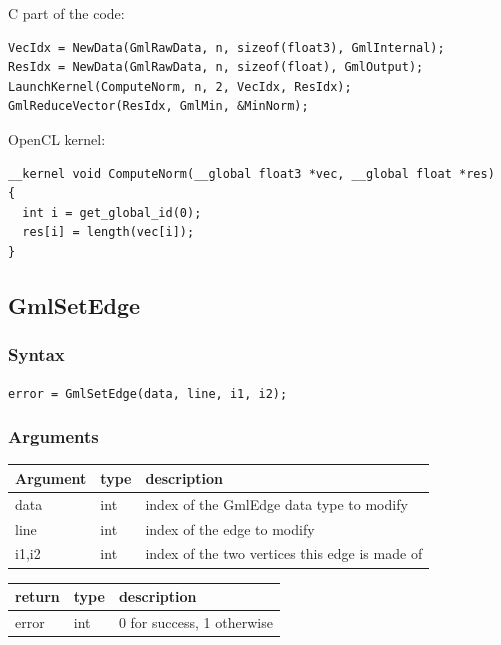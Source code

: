 \documentclass[a4paper,12pt]{article}
\begin{document}
C part of the code:

\begin{tt}
\begin{verbatim}
VecIdx = NewData(GmlRawData, n, sizeof(float3), GmlInternal);
ResIdx = NewData(GmlRawData, n, sizeof(float), GmlOutput);
LaunchKernel(ComputeNorm, n, 2, VecIdx, ResIdx);
GmlReduceVector(ResIdx, GmlMin, &MinNorm);
\end{verbatim}
\end{tt}
\normalfont

OpenCL kernel:

\begin{tt}
\begin{verbatim}
__kernel void ComputeNorm(__global float3 *vec, __global float *res)
{
  int i = get_global_id(0);
  res[i] = length(vec[i]);
}
\end{verbatim}
\end{tt}
\normalfont


\subsection{GmlSetEdge}
\subsubsection*{Syntax}
{\tt error = GmlSetEdge(data, line, i1, i2);}
\subsubsection*{Arguments}

\begin{tabular}{|m{2cm}|m{1.5cm}|m{10.5cm}|}
\hline
Argument   & type   & description \\
\hline
data       & int    & index of the GmlEdge data type to modify \\
\hline
line       & int    & index of the edge to modify \\
\hline
i1,i2      & int    & index of the two vertices this edge is made of \\
\hline
\end{tabular}

\medskip

\begin{tabular}{|m{2cm}|m{1.5cm}|m{10.5cm}|}
\hline
return     & type   & description \\
\hline
error      & int    & 0 for success, 1 otherwise \\
\hline
\end{tabular}
\end{document}
